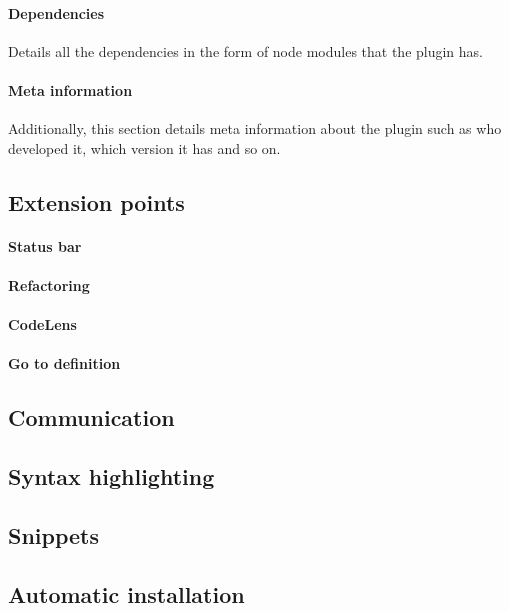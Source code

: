 \paragraph{Dependencies}
Details all the dependencies in the form of node modules that the plugin has.

\paragraph{Meta information}
Additionally, this section details meta information about the plugin such as who developed it, which version it has and so on.






\subsection{Extension points}

\paragraph{Status bar}

\paragraph{Refactoring}

\paragraph{CodeLens}

\paragraph{Go to definition}

\subsection{Communication}

\subsection{Syntax highlighting}

\subsection{Snippets}

\subsection{Automatic installation}
